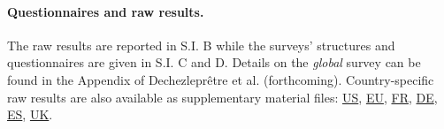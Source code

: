 \begin{small}
\paragraph{\small Questionnaires and raw results.} %
The raw results are reported in S.I. B %
while the surveys' structures and questionnaires are given in S.I. C and D. %
Details on the \textit{global} survey can be found in the Appendix of Dechezleprêtre et al. (forthcoming).\citep{dechezlepretre_fighting_nodate} Country-specific raw results are also available as supplementary material files:  \href{https://github.com/bixiou/international_attitudes_toward_global_policies/raw/main/paper/app_desc_stats_US.pdf}{US}, \href{https://github.com/bixiou/international_attitudes_toward_global_policies/raw/main/paper/app_desc_stats_EU.pdf}{EU}, \href{https://github.com/bixiou/international_attitudes_toward_global_policies/raw/main/paper/app_desc_stats_FR.pdf}{FR}, \href{https://github.com/bixiou/international_attitudes_toward_global_policies/raw/main/paper/app_desc_stats_DE.pdf}{DE}, \href{https://github.com/bixiou/international_attitudes_toward_global_policies/raw/main/paper/app_desc_stats_ES.pdf}{ES}, \href{https://github.com/bixiou/international_attitudes_toward_global_policies/raw/main/paper/app_desc_stats_UK.pdf}{UK}. %



\end{small}
